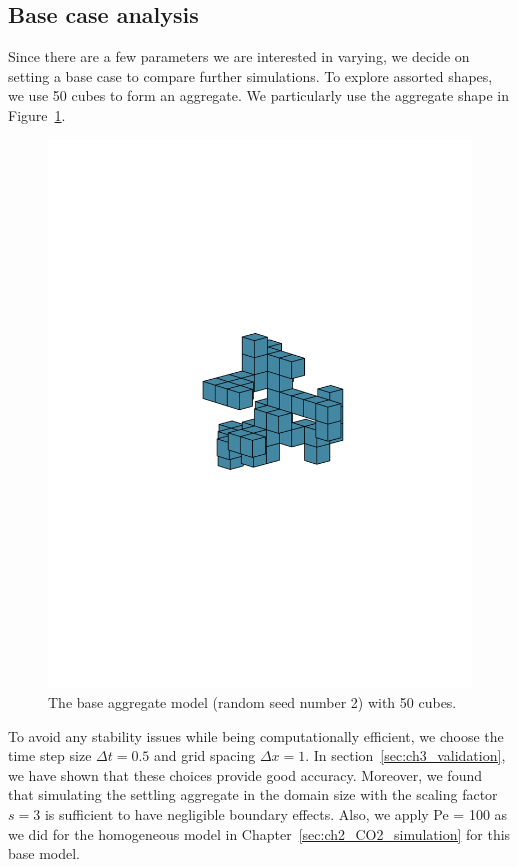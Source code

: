 \subsection{Base case analysis}
Since there are a few parameters we are interested in varying, we decide on setting a base case to compare further simulations. To explore assorted shapes, we use 50 cubes to form an aggregate. We particularly use the aggregate shape in Figure~\ref{fig_NC50_base_seed2}. 
\begin{figure}[ht]
	\begin{center}
		\vspace*{3mm}
		\includegraphics[scale=0.5]{./figures/fig_NC50_seed2}
	\caption{The base aggregate model (random seed number 2) with 50 cubes.}
	\label{fig_NC50_base_seed2}
\end{center}
\end{figure}
To avoid any stability issues while being computationally efficient, we choose the time step size $\Delta t = 0.5$ and grid spacing $\Delta x =1$. In section~\ref{sec:ch3_validation}, we have shown that these choices provide good accuracy. Moreover, we found that simulating the settling aggregate in the domain size with the scaling factor $s = 3$ is sufficient to have negligible boundary effects.  Also, we apply Pe = 100 as we did for the homogeneous model in Chapter~\ref{sec:ch2_CO2_simulation} for this base model.

